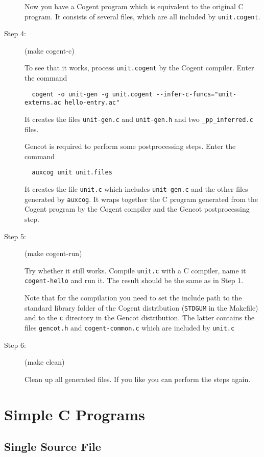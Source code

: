 \documentclass[a4paper]{report}
\newcommand{\code}[1]{\textnormal{\texttt{#1}}}
\begin{document}
\begin{description}
Now you have a Cogent program which is equivalent to the original C program. It consists of several files,
which are all included by \code{unit.cogent}.

\item[Step 4:] (make cogent-c)

To see that it works, process \code{unit.cogent} by the Cogent compiler. Enter the command
\begin{verbatim}
  cogent -o unit-gen -g unit.cogent --infer-c-funcs="unit-externs.ac hello-entry.ac"
\end{verbatim}
It creates the files \code{unit-gen.c} and \code{unit-gen.h} and two \code{\_pp\_inferred.c} files. 

Gencot is required to perform some postprocessing steps. Enter the command
\begin{verbatim}
  auxcog unit unit.files
\end{verbatim}
It creates the file \code{unit.c} which includes \code{unit-gen.c} and the other files generated by \code{auxcog}. It wraps together 
the C program generated from the Cogent program by the Cogent compiler and the Gencot postprocessing step.

\item[Step 5:] (make cogent-run)

Try whether it still works. Compile \code{unit.c} with a C compiler, name it \code{cogent-hello} and run it. The result should be the same
as in Step 1.

Note that for the compilation you need to set the include path to the standard library folder of the Cogent 
distribution (\code{STDGUM} in the Makefile) and to the \code{c} directory in the Gencot distribution. The latter contains the files
\code{gencot.h} and \code{cogent-common.c} which are included by \code{unit.c}

\item[Step 6:] (make clean)

Clean up all generated files. If you like you can perform the steps again.
\end{description}

\chapter{Simple C Programs}

\section{Single Source File}
\label{simple-single}
\end{document}
